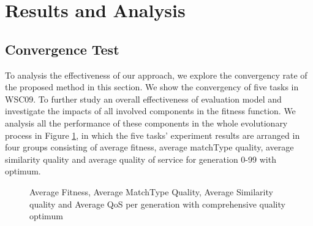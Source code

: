 \documentclass{llncs}
\begin{document}
\section{Results and Analysis}\label{results_analysis}
\subsection{Convergence Test}\label{convergenceTest}
To analysis the effectiveness of our approach, we explore the convergency rate of the proposed method in this section. We show the convergency of five tasks in WSC09. To further study an overall effectiveness of evaluation model and investigate the impacts of all involved components in the fitness function. We analysis all the performance of these components in the whole evolutionary process in Figure \ref{exp_fitnessvalue}, in which the five tasks' experiment results are arranged in four groups consisting of average fitness, average matchType quality, average similarity quality and average quality of service for generation 0-99 with optimum.
\begin{figure}[h]
\centerline{
}
 \caption{Average Fitness, Average MatchType Quality, Average Similarity quality and Average QoS per generation with comprehensive quality optimum}
 \label{exp_fitnessvalue}
\end{figure}
\end{document}
